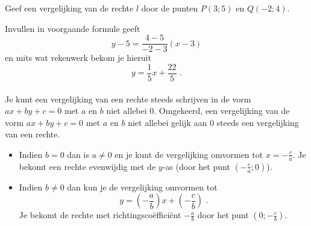 \begin{voorbeeld}
Geef een vergelijking van de rechte $l$ door de punten $P(3;5)$ en $Q(-2;4)$.

\begin{center}
			
\end{center}



Invullen in voorgaande formule geeft
\[
y-5=\frac{4-5}{-2-3}(x-3)
\]
en mits wat rekenwerk bekom je hieruit
\[
y=\frac{1}{5}x+\frac{22}{5} \text { .}
\]\\

Je kunt een vergelijking van een rechte steeds schrijven in de vorm $ax+by+c=0$ met $a$ en $b$ niet allebei 0.
Omgekeerd, een vergelijking van de vorm $ax+by+c=0$ met $a$ en $b$ niet allebei gelijk aan 0 steeds een vergelijking van een rechte.
\begin{itemize}
\item Indien $b=0$ dan is $a \neq 0$ en je kunt de vergelijking omvormen tot $x=-\frac{c}{a}$.
Je bekomt een rechte evenwijdig met de $y$-as (door het punt $(-\frac{c}{a};0)$).
\item Indien $b \neq 0$ dan kun je de vergelijking omvormen tot
\[
y=\left( -\frac{a}{b}  \right)x+\left(  -\frac{c}{b} \right) \text { .}
\]
Je bekomt de rechte met richtingsco\"effici\"ent $-\frac {a}{b}$ door het punt $(0; -\frac{c}{b})$.
\end{itemize}

\end{voorbeeld}